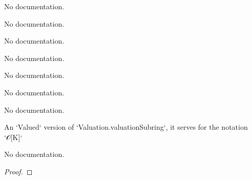 \begin{theorem}\label{varphi_comp_field_ext}
                No documentation.
    \end{theorem}

\begin{theorem}\label{psi_comp_field_ext}
                No documentation.
    \end{theorem}

\begin{theorem}\label{Valued.le_iff_val_le}
                No documentation.
    \end{theorem}

\begin{theorem}\label{Valued.lt_iff_val_lt}
                No documentation.
    \end{theorem}

\begin{theorem}\label{Valued.le_one_iff_val_le_one}
                No documentation.
    \end{theorem}

\begin{theorem}\label{Valued.lt_one_iff_val_lt_one}
                No documentation.
    \end{theorem}

\begin{theorem}\label{Valued.zero_le}
                No documentation.
    \end{theorem}

\begin{definition}\label{Valued.valuationSubring}
        \leanok
                An `Valued` version of `Valuation.valuationSubring`, it serves for the notation `𝒪[K]`
    \end{definition}

\begin{theorem}\label{Valued.integer_valuation_eq}
        \leanok
                No documentation.
    \end{theorem}

\begin{proof}
    \leanok
\end{proof}

